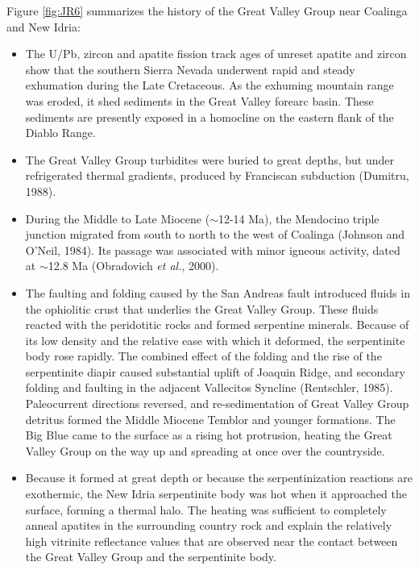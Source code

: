 \documentclass[11pt,twoside]{article}
\begin{document}
Figure \ref{fig:JR6} summarizes the  history of the Great Valley Group
near Coalinga and New Idria:
\begin{itemize}
\item  The U/Pb,  zircon and  apatite  fission track  ages of  unreset
 apatite  and zircon show  that the  southern Sierra  Nevada underwent
 rapid  and steady  exhumation  during the  Late  Cretaceous.  As  the
 exhuming mountain  range was eroded,  it shed sediments in  the Great
 Valley  forearc basin.  These  sediments are  presently exposed  in a
 homocline on the eastern flank of the Diablo Range.
\item The Great  Valley Group turbidites were buried  to great depths,
 but  under  refrigerated thermal  gradients,  produced by  Franciscan
 subduction (Dumitru, 1988).
\item  During  the  Middle   to  Late  Miocene  ($\sim$12-14  Ma),  the
 Mendocino triple junction migrated from south to north to the west of
 Coalinga (Johnson and O'Neil, 1984).  Its passage was associated with
 minor igneous  activity, dated at  $\sim$12.8 Ma (Obradovich  {\it et
 al.}, 2000).
\item  The  faulting and  folding  caused  by  the San  Andreas  fault
 introduced fluids  in the ophiolitic  crust that underlies  the Great
 Valley Group.   These fluids reacted  with the peridotitic  rocks and
 formed  serpentine  minerals. Because  of  its  low  density and  the
 relative  ease with  which it  deformed, the  serpentinite  body rose
 rapidly.   The combined effect  of the  folding and  the rise  of the
 serpentinite diapir  caused substantial uplift of  Joaquin Ridge, and
 secondary folding  and faulting  in the adjacent  Vallecitos Syncline
 (Rentschler,   1985).     Paleocurrent   directions   reversed,   and
 re-sedimentation  of Great  Valley Group  detritus formed  the Middle
 Miocene Temblor  and younger  formations.  The Big  Blue came  to the
 surface as a rising hot protrusion, heating the Great Valley Group on
 the way up and spreading at once over the countryside.
\item Because it formed at great depth or because the serpentinization
 reactions  are exothermic, the  New Idria  serpentinite body  was hot
 when it approached the surface,  forming a thermal halo.  The heating
 was  sufficient  to completely  anneal  apatites  in the  surrounding
 country rock  and explain  the relatively high  vitrinite reflectance
 values that  are observed near  the contact between the  Great Valley
 Group and the serpentinite body.

\end{itemize}
\end{document}

